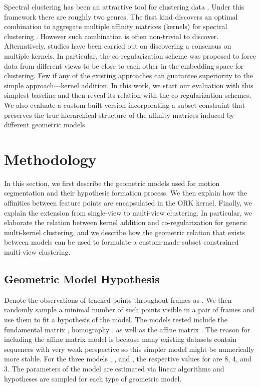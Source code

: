 \documentclass[10pt,twocolumn,letterpaper]{article}
\begin{document}
Spectral clustering has been an attractive tool for clustering data  \cite{von2007tutorial}. Under this framework there are roughly two genres. The first kind discovers an optimal combination to aggregate multiple affinity matrices (kernels) for spectral clustering \cite{Huang2012,lange2006fusion,Wang2013}. However such combination is often non-trivial to discover. Alternatively, studies have been carried out on discovering a consensus on multiple kernels. In particular, the co-regularization scheme \cite{Kumar2011} was proposed to force data from different views to be close to each other in the embedding space for clustering. Few if any of the existing approaches can guarantee superiority to the simple approach---kernel addition. In this work, we start our evaluation with this simplest baseline and then reveal its relation with the co-regularization schemes. {We also evaluate a custom-built version incorporating a subset constraint that preserves the true hierarchical structure of the affinity matrices induced by different geometric models}.


\section{Methodology}

In this section, we first describe the geometric models used for motion segmentation and their hypothesis formation process. We then explain how the affinities between feature points are encapsulated in the ORK kernel\cite{Lai2017}. Finally, we explain the extension from single-view to multi-view clustering. In particular, we elaborate the relation between kernel addition and co-regularization for generic multi-kernel clustering, and we describe how the geometric relation that exists between models can be used to formulate a custom-made subset constrained multi-view clustering.

\subsection{Geometric Model Hypothesis}

Denote the observations of tracked points throughout  frames as . We then randomly sample a minimal number of  such points visible in a pair of frames and use them to fit a hypothesis of the model. The models tested include the fundamental matrix , homography , as well as the affine matrix . The reason for including the affine matrix model is because many existing datasets contain sequences with very weak perspective so this simpler model might be numerically more stable. For the three models , , and , the respective values for  are 8, 4, and 3. The parameters of the model are estimated via linear algorithms \cite{hartley2003multiple} and  hypotheses are sampled for each type of geometric model. 
\end{document}
